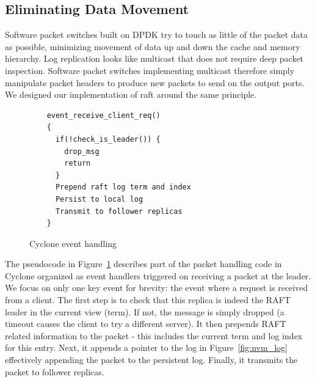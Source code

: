 \documentclass[pageno]{jpaper}
\begin{document}
\subsection{Eliminating Data Movement}
Software packet switches built on DPDK try to touch as little of the packet data
as possible, minimizing movement of data up and down the cache and memory
hierarchy. Log replication looks like multicast that does not require deep
packet inspection. Software packet switches implementing multicast therefore
simply manipulate packet headers to produce new packets to send on the output
ports. We designed our implementation of raft around the same principle.

\begin{figure}
\begin{verbatim}
    event_receive_client_req()
    {
      if(!check_is_leader()) {
        drop_msg
        return
      }
      Prepend raft log term and index
      Persist to local log
      Transmit to follower replicas
    }
\end{verbatim}
\caption{Cyclone event handling}
\label{fig:control_plane}
\end{figure}


The pseudocode in Figure~\ref{fig:control_plane} describes part of the packet
handling code in Cyclone organized as event handlers triggered on receiving a
packet at the leader. We focus on only one key event for brevity: the event
where a request is received from a client. The first step is to check that this
replica is indeed the RAFT leader in the current view (term). If not, the
message is simply dropped (a timeout causes the client to try a different
server). It then prepends RAFT related information to the packet - this includes
the current term and log index for this entry. Next, it appends a pointer to the
log in Figure~\ref{fig:nvm_log} effectively appending the packet to the
persistent log. Finally, it transmits the packet to follower replicas.
\end{document}
